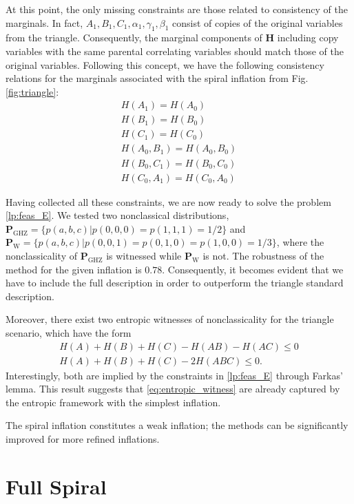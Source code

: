\documentclass[reprint,pra, twocolumn, amsmath,amssymb,
 aps,superscriptaddress,]{revtex4-2}
\begin{document}
At this point, the only missing constraints are those related to consistency of the marginals. In fact, $A_1,B_1,C_1, \alpha_1,\gamma_1, \beta_1$ consist of copies of the original variables from the triangle. Consequently, the marginal components of $\mathbf{H}$ including copy variables with the same parental correlating variables should match those of the original variables. Following this concept, we have the following consistency relations for the marginals associated with the spiral inflation from Fig.\ref{fig:triangle}:
%
\begin{align}\label{eq:consistency1}
    H(A_1) = H(A_0) \nonumber \\
    H(B_1) = H(B_0) \nonumber \\
    H(C_1) = H(C_0) \\
    H(A_0, B_1) = H(A_0, B_0) \nonumber \\
    H(B_0,C_1) = H(B_0, C_0) \nonumber \\
    H(C_0,A_1) = H(C_0,A_0) \nonumber
\end{align}

Having collected all these constraints, we are now ready to solve the problem \eqref{lp:feas_E}. We tested two nonclassical distributions, $\mathbf{P}_{\text{GHZ}} = \{p(a,b,c)| p(0,0,0)=p(1,1,1) = 1/2\}$ and $\mathbf{P}_{\text{W}} = \{p(a,b,c)| p(0,0,1)=p(0,1,0) =p(1,0,0) = 1/3\}$, where the nonclassicality of $\mathbf{P}_{\text{GHZ}}$ is witnessed while $\mathbf{P}_{\text{W}}$ is not. The robustness of the method for the given inflation is $0.78$. Consequently, it becomes evident that we have to include the full description in order to outperform the triangle standard description. 

Moreover, there exist two entropic witnesses of nonclassicality for the triangle scenario, which have the form
%
\begin{align}\label{eq:entropic_witness}
    H(A)+H(B)+H(C)-H(AB)-H(AC)\le 0 \\
    H(A)+H(B)+H(C)-2H(ABC)\le 0.\nonumber
\end{align}
%
Interestingly, both are implied by the constraints in \eqref{lp:feas_E} through Farkas’ lemma. This result suggests that \eqref{eq:entropic_witness} are already captured by the entropic framework with the simplest inflation.

The spiral inflation constitutes a weak inflation; the methods can be significantly improved for more refined inflations.


\section{Full Spiral}
\end{document}
